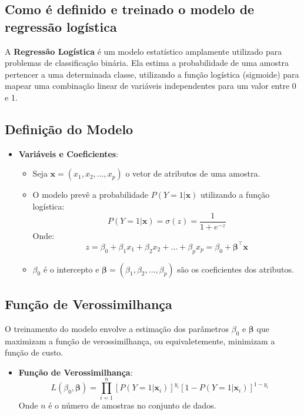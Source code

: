 \documentclass{sciposter}
\begin{document}
\begin{multicols}{3}
\section{Como é definido e treinado o modelo de regressão logística}

A \textbf{Regressão Logística} é um modelo estatístico amplamente utilizado para problemas de classificação binária. Ela estima a probabilidade de uma amostra pertencer a uma determinada classe, utilizando a função logística (sigmoide) para mapear uma combinação linear de variáveis independentes para um valor entre 0 e 1.

\subsection{Definição do Modelo}

\begin{itemize}
    \item \textbf{Variáveis e Coeficientes}:
    \begin{itemize}
        \item Seja $\mathbf{x} = (x_1, x_2, \dots, x_p)$ o vetor de atributos de uma amostra.
        \item O modelo prevê a probabilidade $P(Y=1|\mathbf{x})$ utilizando a função logística:
        \[
        P(Y=1|\mathbf{x}) = \sigma(z) = \frac{1}{1 + e^{-z}}
        \]
        Onde:
        \[
        z = \beta_0 + \beta_1 x_1 + \beta_2 x_2 + \dots + \beta_p x_p = \beta_0 + \mathbf{\beta}^\top \mathbf{x}
        \]
        \item $\beta_0$ é o intercepto e $\mathbf{\beta} = (\beta_1, \beta_2, \dots, \beta_p)$ são os coeficientes dos atributos.
    \end{itemize}
\end{itemize}

\subsection{Função de Verossimilhança}

O treinamento do modelo envolve a estimação dos parâmetros $\beta_0$ e $\mathbf{\beta}$ que maximizam a função de verossimilhança, ou equivaletemente, minimizam a função de custo.

\begin{itemize}
    \item \textbf{Função de Verossimilhança}:
    \[
    L(\beta_0, \mathbf{\beta}) = \prod_{i=1}^{n} [P(Y=1|\mathbf{x}_i)]^{y_i} [1 - P(Y=1|\mathbf{x}_i)]^{1 - y_i}
    \]
    Onde $n$ é o número de amostras no conjunto de dados.
    

\end{itemize}
\end{multicols}
\end{document}

